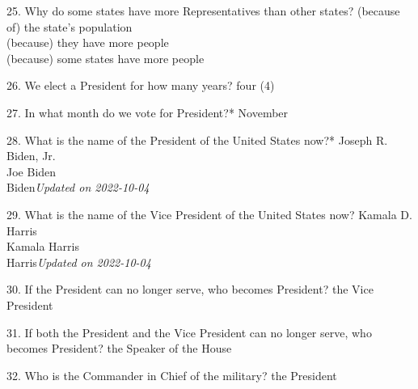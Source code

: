 \documentclass[avery5371,frame]{flashcards}
\begin{document}
        \begin{flashcard}{25. Why do some states have more Representatives than other states?}
        {(because of) the state’s population\\(because) they have more people\\(because) some states have more people}
        \end{flashcard}
        \begin{flashcard}{26. We elect a President for how many years?}
        {four (4)}
        \end{flashcard}
        \begin{flashcard}{27. In what month do we vote for President?*}
        {November}
        \end{flashcard}
        \begin{flashcard}{28. What is the name of the President of the United States now?*}
        {Joseph R. Biden, Jr.\\Joe Biden\\Biden{\footnotesize{\textsl{Updated on 2022-10-04}}}}
        \end{flashcard}
        \begin{flashcard}{29. What is the name of the Vice President of the United States now?}
        {Kamala D. Harris\\Kamala Harris\\Harris{\footnotesize{\textsl{Updated on 2022-10-04}}}}
        \end{flashcard}
        \begin{flashcard}{30. If the President can no longer serve, who becomes President?}
        {the Vice President}
        \end{flashcard}
        \begin{flashcard}{31. If both the President and the Vice President can no longer serve, who becomes President?}
        {the Speaker of the House}
        \end{flashcard}
        \begin{flashcard}{32. Who is the Commander in Chief of the military?}
        {the President}
        \end{flashcard}
\end{document}
